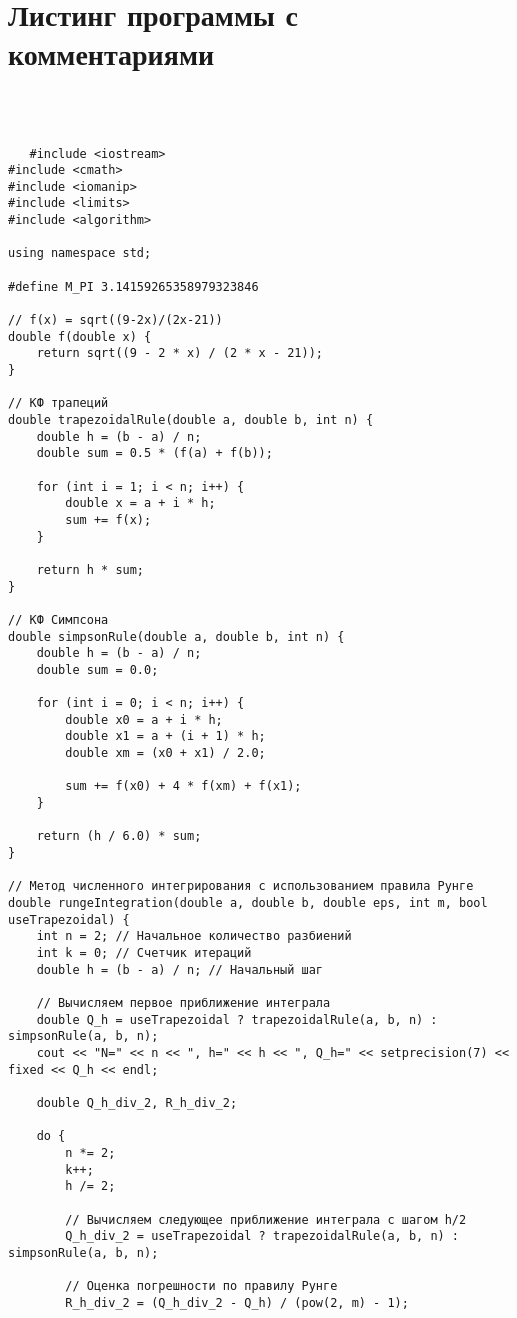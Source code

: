 \documentclass[12pt,a4paper]{article}
\begin{document}
   \section{Листинг программы с комментариями}\\\\
   \begin{verbatim}
   #include <iostream>
#include <cmath>
#include <iomanip>
#include <limits>
#include <algorithm>

using namespace std;

#define M_PI 3.14159265358979323846

// f(x) = sqrt((9-2x)/(2x-21))
double f(double x) {
    return sqrt((9 - 2 * x) / (2 * x - 21));
}

// КФ трапеций
double trapezoidalRule(double a, double b, int n) {
    double h = (b - a) / n;
    double sum = 0.5 * (f(a) + f(b));

    for (int i = 1; i < n; i++) {
        double x = a + i * h;
        sum += f(x);
    }

    return h * sum;
}

// КФ Симпсона
double simpsonRule(double a, double b, int n) {
    double h = (b - a) / n;
    double sum = 0.0;

    for (int i = 0; i < n; i++) {
        double x0 = a + i * h;
        double x1 = a + (i + 1) * h;
        double xm = (x0 + x1) / 2.0;

        sum += f(x0) + 4 * f(xm) + f(x1);
    }

    return (h / 6.0) * sum;
}

// Метод численного интегрирования с использованием правила Рунге
double rungeIntegration(double a, double b, double eps, int m, bool useTrapezoidal) {
    int n = 2; // Начальное количество разбиений
    int k = 0; // Счетчик итераций
    double h = (b - a) / n; // Начальный шаг

    // Вычисляем первое приближение интеграла
    double Q_h = useTrapezoidal ? trapezoidalRule(a, b, n) : simpsonRule(a, b, n);
    cout << "N=" << n << ", h=" << h << ", Q_h=" << setprecision(7) << fixed << Q_h << endl;

    double Q_h_div_2, R_h_div_2;

    do {
        n *= 2;
        k++;
        h /= 2;

        // Вычисляем следующее приближение интеграла с шагом h/2
        Q_h_div_2 = useTrapezoidal ? trapezoidalRule(a, b, n) : simpsonRule(a, b, n);

        // Оценка погрешности по правилу Рунге
        R_h_div_2 = (Q_h_div_2 - Q_h) / (pow(2, m) - 1);


\end{verbatim}
\end{document}
